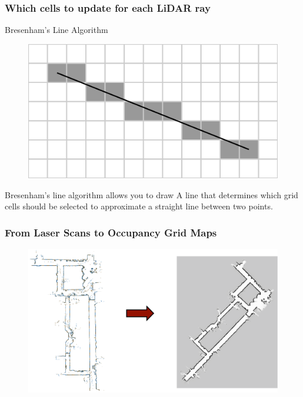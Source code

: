     \begin{frame}
    \frametitle{Which cells to update for each LiDAR ray}
    Bresenham's Line Algorithm
    \begin{figure}[!h]
    \includegraphics[width=0.6\columnwidth]{./images/bresenham.pdf}
    \end{figure}
    
    Bresenham's line algorithm allows you to draw A line that determines which grid cells should be selected to approximate a straight line between two points.
    
    \end{frame}
    
    \begin{frame}
    \frametitle{From Laser Scans to Occupancy Grid Maps}
    
    \begin{figure}[!h]
    \includegraphics[width=0.6\columnwidth]{./images/laser_scans_to_maps.pdf}
    \end{figure}
    
    \end{frame}
    
